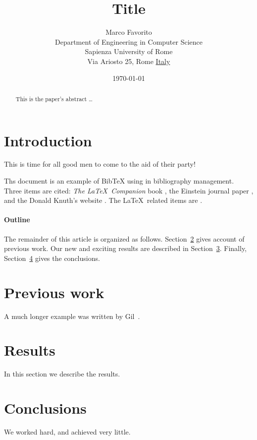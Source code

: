 \documentclass[12pt]{article}
\title{Title \LaTeXe{}}
\author{
        Marco Favorito \\
                Department of Engineering in Computer Science\\
                Sapienza University of Rome\\
                Via Ariosto 25, Rome \underline{Italy}
}
\date{\today}
\begin{document}
\maketitle

\begin{abstract}
This is the paper's abstract \ldots
\end{abstract}

\section{Introduction}
This is time for all good men to come to the aid of their party!

Ths document is an example of BibTeX using in bibliography management. Three items 
are cited: \textit{The \LaTeX\ Companion} book \cite{latexcompanion}, the Einstein
journal paper \cite{einstein}, and the Donald Knuth's website \cite{knuthwebsite}. 
The \LaTeX\ related items are \cite{latexcompanion,knuthwebsite}. 
 
\paragraph{Outline}
The remainder of this article is organized as follows.
Section~\ref{previous work} gives account of previous work.
Our new and exciting results are described in Section~\ref{results}.
Finally, Section~\ref{conclusions} gives the conclusions.

\section{Previous work}\label{previous work}
A much longer \LaTeXe{} example was written by Gil~\cite{Gil:02}.

\section{Results}\label{results}
In this section we describe the results.

\section{Conclusions}\label{conclusions}
We worked hard, and achieved very little.

\printbibliography
\end{document}
